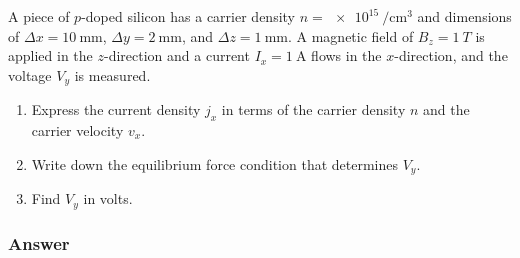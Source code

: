 A piece of $p$-doped silicon has a carrier density $n=\SI[per-mode=reciprocal]{e15}{\per\cm\cubed}$ and dimensions of $\Delta x = \SI{10}{\mm}$, $\Delta y = \SI{2}{\mm}$, and $\Delta z = \SI{1}{\mm}$. A magnetic field of $B_z = \SI{1}{T}$ is applied in the $z$-direction and a current $I_x = \SI{1}{\A}$ flows in the $x$-direction, and the voltage $V_y$ is measured.
\begin{enumerate}
	\item
		Express the current density $j_x$ in terms of the carrier density $n$
		and the carrier velocity $v_x$.
	\item
		Write down the equilibrium force condition that determines $V_y$.
	\item
		Find $V_y$ in volts.
\end{enumerate}

\subsubsection{Answer}

